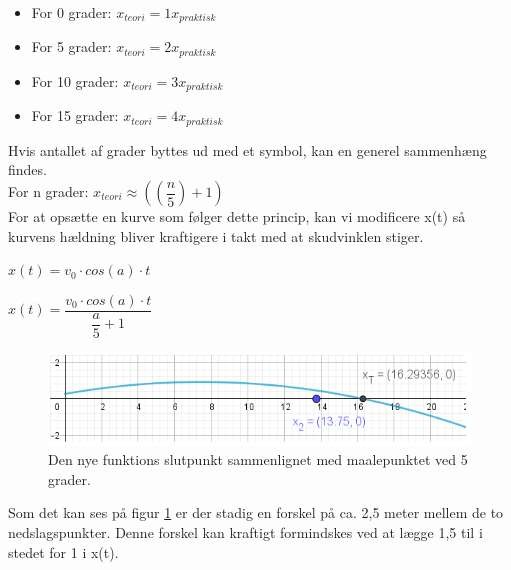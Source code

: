 \begin{itemize}
\item For 0 grader:		$x_{teori} = 1x_{praktisk} $
\item For 5 grader:		$x_{teori} = 2x_{praktisk} $
\item For 10 grader:	$x_{teori} = 3x_{praktisk} $
\item For 15 grader:	$x_{teori} = 4x_{praktisk} $
\end{itemize}

Hvis antallet af grader byttes ud med et symbol, kan en generel sammenhæng findes.\\[0.5cm]

For n grader: $ x_{teori} \approx ((\dfrac{n}{5})+1) $\\[0.5cm]

For at opsætte en kurve som følger dette princip, kan vi modificere x(t) så kurvens hældning bliver kraftigere i takt med at skudvinklen stiger.\\

\begin{center}
\begin{math}
x(t) = v_{0} \cdot cos(a) \cdot t
\end{math}
\end{center}

\begin{center}
\begin{math}
x(t) = \dfrac{v_{0} \cdot cos(a) \cdot t}{\dfrac{a}{5} + 1}
\end{math}
\end{center}

\begin{figure}[H]
\centering
\includegraphics[scale=0.7]{Billeder/Resultatbehandling5.png}
\caption{Den nye funktions slutpunkt sammenlignet med maalepunktet ved 5 grader.}
\label{fig:Resultatbehandling5}
\end{figure}

Som det kan ses på figur \ref{fig:Resultatbehandling5} er der stadig en forskel på ca. 2,5 meter mellem de to nedslagspunkter. Denne forskel kan kraftigt formindskes ved at lægge 1,5 til i stedet for 1 i x(t).\\

